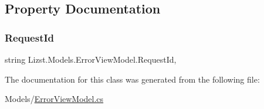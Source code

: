 \subsection{Property Documentation}
\mbox{\label{class_lizst_1_1_models_1_1_error_view_model_a7f1fd47c09e7070153c80e5fa38cfcb3}} 
\subsubsection{\texorpdfstring{RequestId}{RequestId}}
{\footnotesize\ttfamily string Lizst.\+Models.\+Error\+View\+Model.\+Request\+Id\hspace{0.3cm}{\ttfamily [get]}, {\ttfamily [set]}}



The documentation for this class was generated from the following file\+:\begin{DoxyCompactItemize}
\item 
Models/\mbox{\hyperlink{_error_view_model_8cs}{Error\+View\+Model.\+cs}}\end{DoxyCompactItemize}
